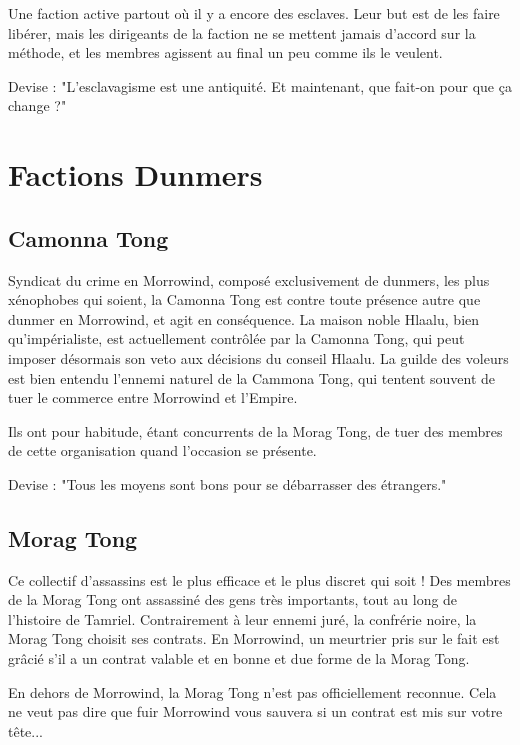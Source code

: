      Une faction active partout où il y a encore des esclaves. Leur but est de les faire libérer, mais les dirigeants de la faction ne se mettent jamais d'accord sur la méthode, et les membres agissent au final un peu comme ils le veulent.
      
      Devise : "L'esclavagisme est une antiquité. Et maintenant, que fait-on pour que ça change ?"
  
  \section{Factions Dunmers}
  
    \subsection{Camonna Tong}
    
      Syndicat du crime en Morrowind, composé exclusivement de dunmers, les plus xénophobes qui soient, la Camonna Tong est contre toute présence autre que dunmer en Morrowind, et agit en conséquence. La maison noble Hlaalu, bien qu'impérialiste, est actuellement contrôlée par la Camonna Tong, qui peut imposer désormais son veto aux décisions du conseil Hlaalu. La guilde des voleurs est bien entendu l'ennemi naturel de la Cammona Tong, qui tentent souvent de tuer le commerce entre Morrowind et l'Empire.
      
      Ils ont pour habitude, étant concurrents de la Morag Tong, de tuer des membres de cette organisation quand l'occasion se présente.
      
      Devise : "Tous les moyens sont bons pour se débarrasser des étrangers."
    
    \subsection{Morag Tong}
    
      Ce collectif d'assassins est le plus efficace et le plus discret qui soit ! Des membres de la Morag Tong ont assassiné des gens très importants, tout au long de l'histoire de Tamriel. Contrairement à leur ennemi juré, la confrérie noire, la Morag Tong choisit ses contrats. En Morrowind, un meurtrier pris sur le fait est grâcié s'il a un contrat valable et en bonne et due forme de la Morag Tong.
      
      En dehors de Morrowind, la Morag Tong n'est pas officiellement reconnue. Cela ne veut pas dire que fuir Morrowind vous sauvera si un contrat est mis sur votre tête...
      

